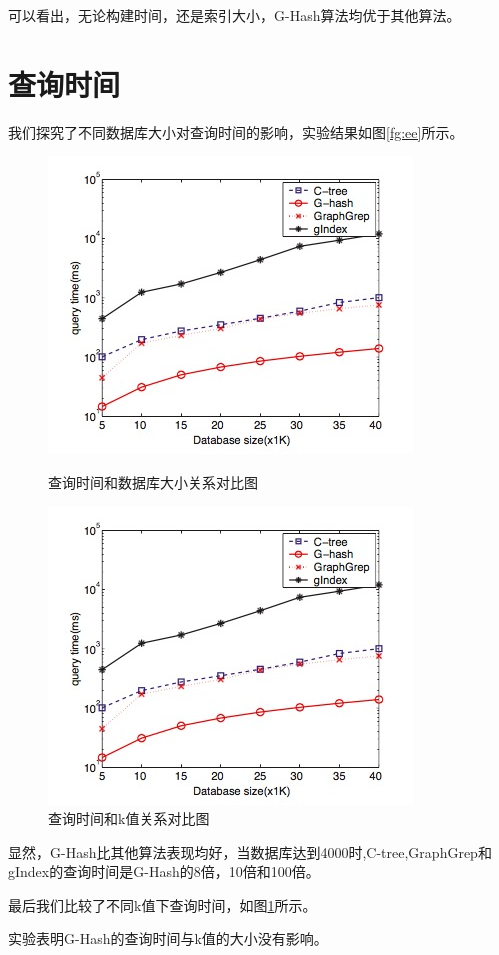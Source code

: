 \documentclass{article}
\begin{document}
可以看出，无论构建时间，还是索引大小，G-Hash算法均优于其他算法。
\section{查询时间}
我们探究了不同数据库大小对查询时间的影响，实验结果如图\ref{fg:ee}所示。
\begin{figure}[htb]
    \centering
    \begin{minipage}[t]{0.5\textwidth}
        \centering
        \includegraphics[width=\textwidth]{qt}
        \caption{查询时间和数据库大小关系对比图}
        \label{fg:ee}
    \end{minipage}%
    \begin{minipage}[t]{0.5\textwidth}
        \centering
         \includegraphics[width=\textwidth]{qt}
        \caption{查询时间和k值关系对比图}
        \label{fg:ek}
    \end{minipage}

\end{figure}

显然，G-Hash比其他算法表现均好，当数据库达到4000时,C-tree,GraphGrep和gIndex的查询时间是G-Hash的8倍，10倍和100倍。

最后我们比较了不同k值下查询时间，如图\ref{fg:ek}所示。


实验表明G-Hash的查询时间与k值的大小没有影响。

\ifx\allfiles\undefined
%
%
\end{document}
